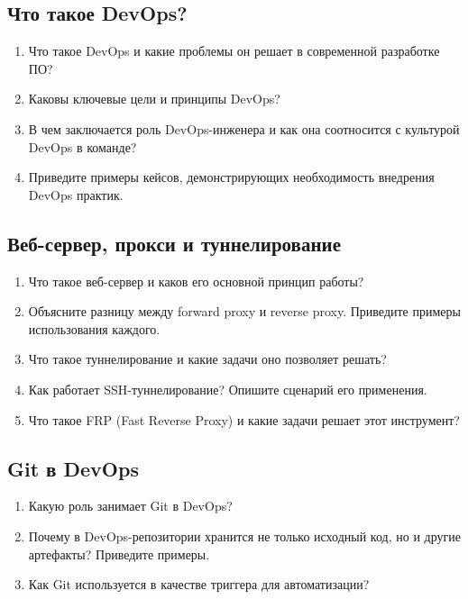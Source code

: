 \documentclass[12pt,a4paper]{article}
\begin{document}
    \subsection{Что такое DevOps?}
    \begin{enumerate}
        \item Что такое DevOps и какие проблемы он решает в современной разработке ПО?
        \item Каковы ключевые цели и принципы DevOps?
        \item В чем заключается роль DevOps-инженера и как она соотносится с культурой DevOps в команде?
        \item Приведите примеры кейсов, демонстрирующих необходимость внедрения DevOps практик.
    \end{enumerate}

    \subsection{Веб-сервер, прокси и туннелирование}
    \begin{enumerate}
        \item Что такое веб-сервер и каков его основной принцип работы?
        \item Объясните разницу между forward proxy и reverse proxy. Приведите примеры использования каждого.
        \item Что такое туннелирование и какие задачи оно позволяет решать?
        \item Как работает SSH-туннелирование? Опишите сценарий его применения.
        \item Что такое FRP (Fast Reverse Proxy) и какие задачи решает этот инструмент?
    \end{enumerate}

    \subsection{Git в DevOps}
    \begin{enumerate}
        \item Какую роль занимает Git в DevOps?
        \item Почему в DevOps-репозитории хранится не только исходный код, но и другие артефакты? Приведите примеры.
        \item Как Git используется в качестве триггера для автоматизации?
    \end{enumerate}
\end{document}
